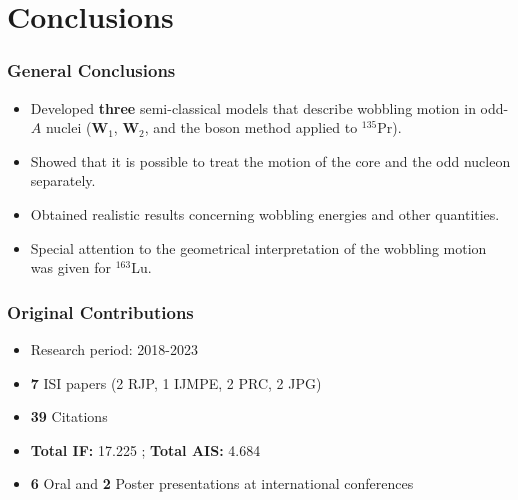 \documentclass{beamer}
\begin{document}
\section{Conclusions}

\begin{frame}
	\frametitle{General Conclusions}
	\begin{itemize}
		\item Developed \textbf{three} semi-classical models that describe wobbling motion in odd-$A$ nuclei ($\mathbf{W}_1$, $\mathbf{W}_2$, and the boson method applied to $^{135}$Pr).
		\item Showed that it is possible to treat the motion of the core and the odd nucleon separately.
		\item Obtained realistic results concerning wobbling energies and other quantities.
		\item Special attention to the geometrical interpretation of the wobbling motion was given for $^{163}$Lu.
	\end{itemize}
\end{frame}


\begin{frame}
	\frametitle{Original Contributions}
	\begin{itemize}
		\item Research period: 2018-2023
		\item \textbf{7} ISI papers (2 RJP, 1 IJMPE, 2 PRC, 2 JPG)
		\item \textbf{39} Citations
		\item \textbf{Total IF:} 17.225 ; \textbf{Total AIS:} 4.684
		\item \textbf{6} Oral and \textbf{2} Poster presentations at international conferences
	\end{itemize}
\end{frame}

\end{document}
